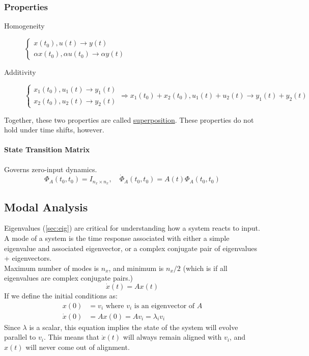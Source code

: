 \documentclass[../notes.tex]{subfiles}
\begin{document}
\subsubsection{Properties}
\begin{description}
    \item[Homogeneity] $\begin{cases*}
        x(t_0), u(t) \rightarrow y(t) \\
        \alpha x(t_0), \alpha u(t_0) \rightarrow \alpha y(t)
    \end{cases*}$
    \item[Additivity] $\begin{cases*}
        x_1(t_0), u_1(t) \rightarrow y_1(t) \\
        x_2(t_0), u_2(t) \rightarrow y_2(t)
    \end{cases*} \Rightarrow x_1(t_0) + x_2(t_0), u_1(t) + u_2(t) \rightarrow y_1(t) + y_2(t)$
\end{description}
Together, these two properties are called \underline{superposition}. These properties do not hold under time shifts, however.
\paragraph{State Transition Matrix}
Governs zero-input dynamics.
\begin{equation*}
    \Phi_A(t_0,t_0) = I_{n_x \times n_x}, \quad \dot{\Phi}_A(t_0,t_0) = A(t)\Phi_A(t_0,t_0)
\end{equation*}
\subsection{Modal Analysis}
Eigenvalues (\underline{\ref{sec:eig}}) are critical for understanding how a system reacts to input. A mode of a system is the time response associated with either a simple eigenvalue and associated eigenvector, or a complex conjugate pair of eigenvalues + eigenvectors. \\
Maximum number of modes is $n_x$, and minimum is $n_x / 2$ (which is if all eigenvalues are complex conjugate pairs.)
\begin{equation*}
    \dot{x}(t) = Ax(t)
\end{equation*}
If we define the initial conditions as:
\begin{align*}
    x(0) &= v_i \text{ where $v_i$ is an eigenvector of }A \\
    \dot{x}(0) &= Ax(0) = Av_i = \lambda_i v_i
\end{align*}
Since $\lambda$ is a scalar, this equation implies the state of the system will evolve parallel to $v_i$. This means that $\dot{x}(t)$ will always remain aligned with $v_i$, and $x(t)$ will never come out of alignment.
\end{document}
